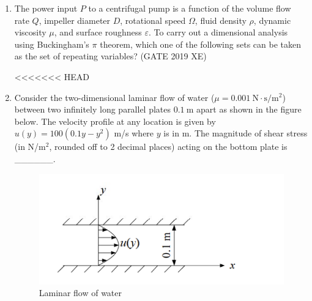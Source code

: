 \documentclass[journal,12pt,onecolumn]{IEEEtran}
\begin{document}
\begin{enumerate}
\item The power input $P$ to a centrifugal pump is a function of the volume flow rate $Q$, impeller diameter $D$, rotational speed $\Omega$, fluid density $\rho$, dynamic viscosity $\mu$, and surface roughness $\varepsilon$. To carry out a dimensional analysis using Buckingham’s $\pi$ theorem, which one of the following sets can be taken as the set of repeating variables?
\hfill{(GATE 2019 XE)} \\
\begin{multicols}{2}
<<<<<<< HEAD
\end{multicols}


\item Consider the two-dimensional laminar flow of water ($\mu=0.001\ \mathrm{N\cdot s/m^2}$) between two infinitely long parallel plates $0.1\ \mathrm{m}$ apart as shown in the figure below. The velocity profile at any location is given by $u(y)=100(0.1y-y^2)$ m/s where $y$ is in m. The magnitude of shear stress (in N/m$^2$, rounded off to 2 decimal places) acting on the bottom plate is \_\_\_\_\_\_.

\begin{figure}[htbp]
  \centering
  \includegraphics[width=.7\columnwidth]{figs/B/fig1.png}
  \caption{Laminar flow of water}
  \label{fig:figs/B/fig1.png}
\end{figure}


\end{enumerate}
\end{document}
